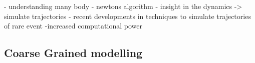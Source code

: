 %

- understanding many body - newtons algorithm
- insight in the dynamics -> simulate trajectories
- recent developments in techniques to simulate trajectories of rare event
-increased computational power
\subsection{Coarse Grained modelling}
